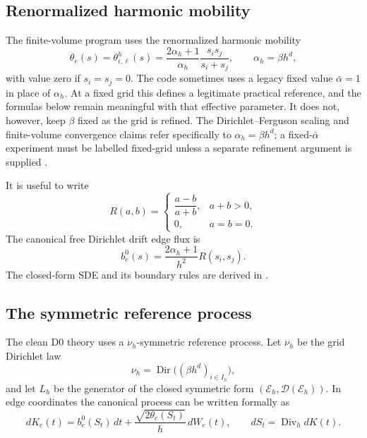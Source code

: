 \documentclass[11pt]{article}
\numberwithin{equation}{section}
\newcommand{\Ih}{I_h}
\newcommand{\dive}{\operatorname{Div}_h}
\newcommand{\1}{\mathbf 1}
\begin{document}
\subsection{Renormalized harmonic mobility}

The finite-volume program uses the renormalized harmonic mobility
\begin{equation}\label{eq:theta-d0}
  \theta_e(s)=\theta^h_{i,\ell}(s)=\frac{2\alpha_h+1}{\alpha_h}\frac{s_i s_j}{s_i+s_j},
  \qquad \alpha_h=\beta h^d,
\end{equation}
with value zero if \(s_i=s_j=0\).  The code sometimes uses a legacy fixed value \(\bar \alpha=1\) in place of \(\alpha_h\).  At a fixed grid this defines a legitimate practical reference, and the formulas below remain meaningful with that effective parameter.  It does not, however, keep \(\beta\) fixed as the grid is refined.  The Dirichlet--Ferguson scaling and finite-volume convergence claims refer specifically to \(\alpha_h=\beta h^d\); a fixed-\(\bar\alpha\) experiment must be labelled fixed-grid unless a separate refinement argument is supplied \cite[Secs.~4--6]{eulerian-manuscript}.

It is useful to write
\begin{equation}\label{eq:R-d0}
  R(a,b)=\begin{cases}
  \dfrac{a-b}{a+b},&a+b>0,\\[0.5em]
  0,&a=b=0.
  \end{cases}
\end{equation}
The canonical free Dirichlet drift edge flux is
\begin{equation}\label{eq:canonical-drift-flux-d0}
  b_e^0(s)=\frac{2\alpha_h+1}{h^2}R(s_i,s_j).
\end{equation}
The closed-form SDE and its boundary rules are derived in \cite[Sec.~6]{eulerian-manuscript}.

\subsection{The symmetric reference process}

The clean D0 theory uses a \(\nu_h\)-symmetric reference process.  Let \(\nu_h\) be the grid Dirichlet law
\[
  \nu_h=\operatorname{Dir}\bigl((\beta h^d)_{i\in\Ih}\bigr),
\]
and let \(L_h\) be the generator of the closed symmetric form \((\mathcal E_h,\mathcal D(\mathcal E_h))\).  In edge coordinates the canonical process can be written formally as
\begin{equation}\label{eq:canonical-edge-flux-d0}
  dK_e(t)=b_e^0(S_t)\,dt+\frac{\sqrt{2\theta_e(S_t)}}{h}\,dW_e(t),
  \qquad dS_t=\dive dK(t).
\end{equation}
\end{document}
